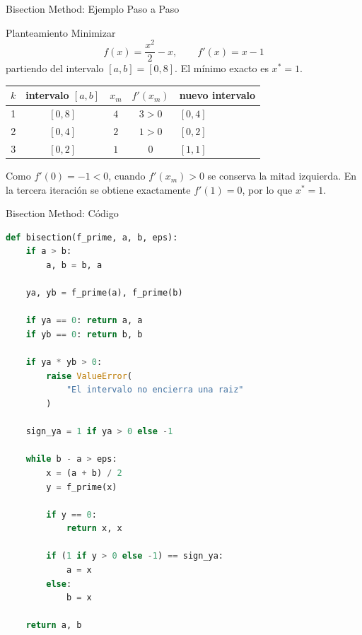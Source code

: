 \begin{frame}{Bisection Method: Ejemplo Paso a Paso}
    \begin{exampleblock}{Planteamiento}
        \small
        Minimizar
        \[
            f(x)=\frac{x^2}{2}-x,
            \qquad
            f'(x)=x-1
        \]
        partiendo del intervalo $[a,b]=[0,8]$.
        El mínimo exacto es $x^*=1$.
    \end{exampleblock}

    \vspace{-0.3em}

    \begin{center}
    \scriptsize
    \begin{tabular}{c c c c l}
        \toprule
        $k$ & intervalo $[a,b]$ & $x_m$ & $f'(x_m)$
            & nuevo intervalo \\
        \midrule
        1 & $[0,8]$ & $4$ & $3>0$ & $[0,4]$ \\
        2 & $[0,4]$ & $2$ & $1>0$ & $[0,2]$ \\
        3 & $[0,2]$ & $1$ & $0$   & $[1,1]$ \\
        \bottomrule
    \end{tabular}
    \end{center}

    \footnotesize
    Como $f'(0)=-1<0$, cuando $f'(x_m)>0$ se conserva la mitad
    izquierda. En la tercera iteración se obtiene exactamente
    $f'(1)=0$, por lo que $x^*=1$.
\end{frame}


\begin{frame}[fragile]{Bisection Method: Código}
\begin{lstlisting}[language=Python,basicstyle=\ttfamily\tiny]
def bisection(f_prime, a, b, eps):
    if a > b:
        a, b = b, a

    ya, yb = f_prime(a), f_prime(b)

    if ya == 0: return a, a
    if yb == 0: return b, b

    if ya * yb > 0:
        raise ValueError(
            "El intervalo no encierra una raiz"
        )

    sign_ya = 1 if ya > 0 else -1

    while b - a > eps:
        x = (a + b) / 2
        y = f_prime(x)

        if y == 0:
            return x, x

        if (1 if y > 0 else -1) == sign_ya:
            a = x
        else:
            b = x

    return a, b
\end{lstlisting}
\end{frame}


